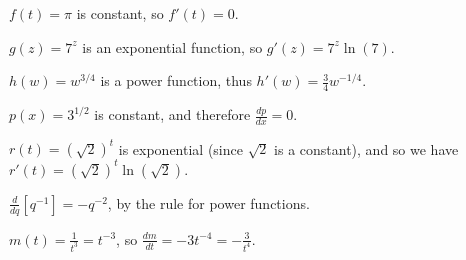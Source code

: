 \begin{activitySolution}
\ba
	\item $f(t) = \pi$ is constant, so $f'(t) = 0$.
	\item $g(z) = 7^z$ is an exponential function, so $g'(z) = 7^z \ln(7)$.
	\item $h(w) = w^{3/4}$ is a power function, thus $h'(w) = \frac{3}{4} w^{-1/4}$.
	\item $p(x) = 3^{1/2}$ is constant, and therefore $\frac{dp}{dx} = 0$.
	\item $r(t) = (\sqrt{2})^t$ is exponential (since $\sqrt{2}$ is a constant), and so we have $r'(t) = (\sqrt{2})^t \ln (\sqrt{2})$.
	\item $\frac{d}{dq}[q^{-1}] = -q^{-2}$, by the rule for power functions.
	\item $m(t) = \frac{1}{t^3} = t^{-3}$, so $\frac{dm}{dt} = -3t^{-4} = -\frac{3}{t^4}$.
\ea
\end{activitySolution}
\aftera